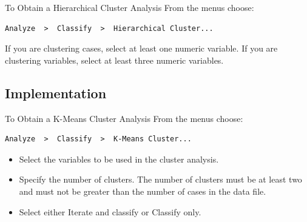 \documentclass[a4paper,12pt]{article}
\begin{document}
To Obtain a Hierarchical Cluster Analysis
From the menus choose:
\begin{verbatim}
Analyze  >  Classify  >  Hierarchical Cluster...

\end{verbatim}
If you are clustering cases, select at least one numeric variable. If you are clustering variables, select at least three numeric variables. 






\subsection*{Implementation}
To Obtain a K-Means Cluster Analysis
From the menus choose:
\begin{verbatim}
Analyze  >  Classify  >  K-Means Cluster...    
\end{verbatim}

\begin{itemize}
\item 	Select the variables to be used in the cluster analysis. 
\item 	Specify the number of clusters. The number of clusters must be at least two and must not be greater than the number of cases in the data file.
\item 	Select either Iterate and classify or Classify only.
\end{itemize}
\end{document}
